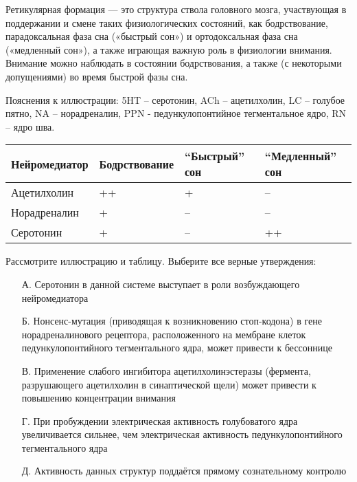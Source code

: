 
Ретикулярная формация — это структура ствола головного мозга, участвующая в поддержании и смене таких физиологических состояний, как бодрствование, парадоксальная фаза сна («быстрый сон») и ортодоксальная фаза сна («медленный сон»), а также играющая важную роль в физиологии внимания. Внимание можно наблюдать в состоянии бодрствования, а также (с некоторыми допущениями) во время быстрой фазы сна. 


Пояснения к иллюстрации: 5HT – серотонин, ACh – ацетилхолин, LC – голубое пятно, NA – норадреналин, PPN - педункулопонтийное тегментальное ядро, RN – ядро шва.

\begin{table}[H]
    \begin{center}
        \begin{tabular}{|p{3cm}|p{3cm}|p{3cm}|p{3cm}|}
            \hline
            Нейромедиатор & Бодрствование & “Быстрый” сон & “Медленный” сон \\
            \hline
            Ацетилхолин & ++ & + & -- \\
            \hline
            Норадреналин & + & -- & -- \\
            \hline
            Серотонин & + & -- & ++ \\
            \hline
        \end{tabular}
    \end{center}
\end{table}

Рассмотрите иллюстрацию и таблицу. Выберите все верные утверждения:
\begin{enumerate}
    \item[А.] Серотонин в данной системе выступает в роли возбуждающего нейромедиатора
    \item[Б.] Нонсенс-мутация (приводящая к возникновению стоп-кодона)  в гене норадреналинового рецептора, расположенного на мембране клеток педункулопонтийного тегментального ядра, может привести к бессоннице
    \item[В.] Применение слабого ингибитора ацетилхолинэстеразы (фермента, разрушающего ацетилхолин в синаптической щели) может привести к повышению концентрации внимания
    \item[Г.] При пробуждении электрическая активность голубоватого ядра увеличивается сильнее, чем электрическая активность педункулопонтийного тегментального ядра
    \item[Д.] Активность данных структур поддаётся прямому сознательному контролю
\end{enumerate} 

